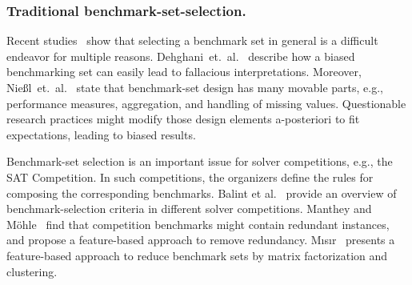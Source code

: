\documentclass[runningheads]{llncs}
\begin{document}
\subsubsection{Traditional benchmark-set-selection.}
Recent studies~\cite{abs-2107-07002,NiesslHWCB22} show that selecting a benchmark set in general is a difficult endeavor for multiple reasons.
Dehghani~et.~al.~\cite{abs-2107-07002} describe how a biased benchmarking set can easily lead to fallacious interpretations.
Moreover, Nießl~et.~al.~\cite{NiesslHWCB22} state that benchmark-set design has many movable parts, e.g., performance measures, aggregation, and handling of missing values.
Questionable research practices might modify those design elements a-posteriori to fit expectations, leading to biased results.

Benchmark-set selection is an important issue for solver competitions, e.g., the SAT Competition.
In such competitions, the organizers define the rules for composing the corresponding benchmarks.
Balint et al.~\cite{balint2015overview} provide an overview of benchmark-selection criteria in different solver competitions.
Manthey and Möhle~\cite{manthey2016better} find that competition benchmarks might contain redundant instances, and propose a feature-based approach to remove redundancy.
M{\i}s{\i}r~\cite{misir2021benchmark} presents a feature-based approach to reduce benchmark sets by matrix factorization and clustering.
\end{document}
